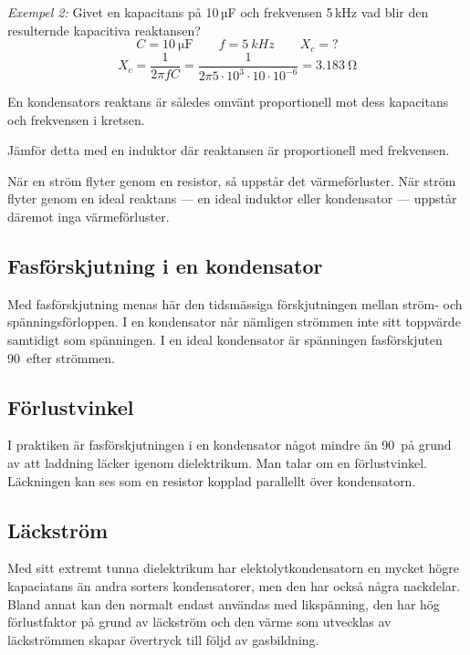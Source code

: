 \noindent\emph{Exempel 2:} Givet en kapacitans på 10\,µF och frekvensen 5\,kHz vad blir den resulternde kapacitiva reaktansen?
\[ C = \SI{10}{\micro\farad} \qquad f = \SI{5}{kHz} \qquad X_c = ? \]
\[
X_c = \frac{1}{2\pi f C} = \frac{1}{2\pi 5 \cdot 10^3 \cdot 10 \cdot 10^{-6}}
= \SI{3,183}{\ohm}
\]

En kondensators reaktans är således omvänt proportionell mot dess kapacitans
och frekvensen i kretsen.


Jämför detta med en induktor där reaktansen är proportionell med
frekvensen.

När en ström flyter genom en resistor, så uppstår det värmeförluster.
När ström flyter genom en ideal reaktans --- en ideal induktor eller
kondensator --- uppstår däremot inga värmeförluster.

\subsection{Fasförskjutning i en kondensator}

Med fasförskjutning menas här den tidsmässiga förskjutningen mellan ström- och
spänningsförloppen. I en kondensator når nämligen strömmen inte sitt toppvärde
samtidigt som spänningen.
I en ideal kondensator är spänningen fasförskjuten 90\degree~efter strömmen.

\subsection{Förlustvinkel}

I praktiken är fasförskjutningen i en kondensator något mindre än 90\degree\ på
grund av att laddning läcker igenom dielektrikum. Man talar om en förlustvinkel.
Läckningen kan ses som en resistor kopplad parallellt över kondensatorn.

\subsection{Läckström}

Med sitt extremt tunna dielektrikum har elektolytkondensatorn en mycket högre
kapaciatans än andra sorters kondensatorer, men den har också några nackdelar.  
Bland annat kan den normalt endast användas med likspänning, den har hög 
förlustfaktor på grund av läckström och den värme som utvecklas av läckströmmen 
skapar övertryck till följd av gasbildning.

